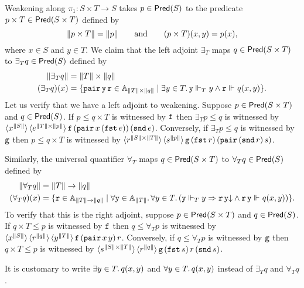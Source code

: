 Weakening along $\pi_1 : S \times T \to S$ takes $p
\in \Pred{S}$ to the predicate $p \times T \in
\Pred{S \times T}$ defined by
%
\begin{equation*}
  \T{p \times T} = \T{p}
  \qquad\text{and}\qquad
  (p \times T)(x,y) = p(x),
\end{equation*}
%
where $x \in S$ and $y \in T$. We claim that the left adjoint
$\exists_{T}$ maps $q \in \Pred{S \times T}$ to
$\exists_{T} q \in \Pred{S}$ defined by
%
\begin{align*}
  \T{\exists_{T} q} &= \T{T} \times \T{q} \\
  (\exists_{T} q)(x) &=
  \set{ \combPair\,\R{y}\,\R{r} \in \Atyp{\T{T} \times \T{q}} \such
    \some{y \in T}{\R{y} \rz[T] y \land \R{r} \rz q(x,y)}
  }.
\end{align*}
%
Let us verify that we have a left adjoint to weakening. Suppose $p \in
\Pred{S \times T}$ and $q \in \Pred{S}$. If $p \leq
q \times T$ is witnessed by $\R{f}$ then $\exists_{T} p
\leq q$ is witnessed by $\tpcalam{x}{\T{S}} \tpcalam{e}{\T{T} \times
    \T{p}}{\R{f}\, (\combPair \, x \, (\combFst\, e)) \, (\combSnd \, e)}$.
Conversely, if $\exists_{T} p \leq q$ is witnessed by $\R{g}$
then $p \leq q \times T$ is witnessed by $\tpcalam{r}{\T{S}
    \times \T{T}} \tpcalam{s}{\T{p}}{\R{g} \,
  (\combFst\,r)\, (\combPair \, (\combSnd \, r) \, s)}$.

Similarly, the universal quantifier $\forall_{T}$ maps $q \in
\Pred{S \times T}$ to $\forall_{T} q \in
\Pred{S}$ defined by
%
\begin{align*}
  \T{\forall_{T} q} &= \T{T} \to \T{q} \\
  (\forall_{T} q)(x) &=
  \set{ \R{r} \in \Atyp{\T{T} \to \T{q}} \such
    \all{\R{y} \in \Atyp{\T{T}}}{
      \all{y \in T}
        (\R{y} \rz[T] y \lthen
        \defined{\R{r}\,\R{y}} \land
        \R{r}\,\R{y} \rz q(x,y))
    }
  }.
\end{align*}
%
To verify that this is the right adjoint, suppose $p \in \Pred{S
  \times T}$ and $q \in \Pred{S}$. If $q \times T
\leq p$ is witnessed by $\R{f}$ then $q \leq \forall_{T} p$ is
witnessed by $\tpcalam{x}{\T{S}} \tpcalam{r}{\T{q}}
  \tpcalam{y}{\T{T}}{\R{f} \, (\combPair \, x \, y) \, r}$. Conversely,
if $q \leq \forall_{T} p$ is witnessed by $\R{g}$ then $q \times
T \leq p$ is witnessed by $\tpcalam{s}{\T{S} \times \T{T}}
  \tpcalam{r}{\T{q}}{\R{g} \, (\combFst \, s) \, r \, (\combSnd \, s)}$.

It is customary to write $\some{y \in T}{q(x,y)}$ and
$\all{y \in T}{q(x,y)}$ instead of $\exists_{T} q$ and
$\forall_{T} q$.

